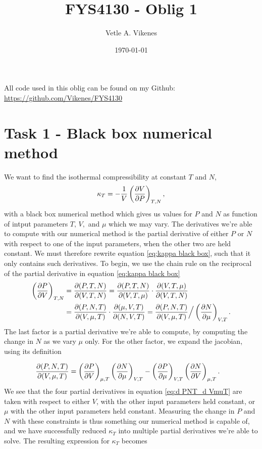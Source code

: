 \documentclass[reprint,english,notitlepage,aps,nobalancelastpage,nofootinbib]{revtex4-1}
\newcommand{\closed}[1]{\left(#1\right)}
\newcommand{\kt}{\kappa_T}
\newcommand{\tmdv}[4]{\closed{\pdv{#1}{#2}}_{#3,#4}}
\newcommand{\jacobian}[2]{\pdv{(#1)}{(#2)}}
\begin{document}
\begin{center}
\title{\Huge FYS4130 - Oblig 1}
\author{\large Vetle A. Vikenes}
\date{\today}
\noaffiliation


\maketitle
\end{center}
\onecolumngrid

All code used in this oblig can be found on my Github: \url{https://github.com/Vikenes/FYS4130}

\section*{\large Task 1 - Black box numerical method}
We want to find the isothermal compressibility at constant $T$ and $N$,
\begin{align} \label{eq:kappa black box}
	\kt = -\frac{1}{V}\closed{\pdv{V}{P}}_{T,N},
\end{align}
with a black box numerical method which gives us values for $P$ and $N$ as function of intput parameters $T,\,V,$ and $\mu$ which we may vary. The derivatives we're able to compute with our numerical method is the partial derivative of either $P$ or $N$ with respect to one of the input parameters, when the other two are held constant. We must therefore rewrite equation \eqref{eq:kappa black box}, such that it only contains such derivatives. To begin, we use the chain rule on the reciprocal of the partial derivative in equation \eqref{eq:kappa black box}
\begin{align*}
	\tmdv{P}{V}{T}{N} &= \jacobian{P,T,N}{V,T,N}=\jacobian{P,T,N}{V,T,\mu}\cdot\jacobian{V,T,\mu}{V,T,N} \\
	&= \jacobian{P,N,T}{V,\mu,T}\cdot\jacobian{\mu,V,T}{N,V,T}=
	\jacobian{P,N,T}{V,\mu,T} \Big/ \tmdv{N}{\mu}{V}{T}.
\end{align*}
The last factor is a partial derivative we're able to compute, by computing the change in $N$ as we vary $\mu$ only. For the other factor, we expand the jacobian, using its definition 

\begin{align}
	\jacobian{P,N,T}{V,\mu,T} &= \tmdv{P}{V}{\mu}{T}\tmdv{N}{\mu}{V}{T}-\tmdv{P}{\mu}{V}{T}\tmdv{N}{V}{\mu}{T}. \label{eq:d PNT_d VmuT}
\end{align}
We see that the four partial derivatives in equation \eqref{eq:d PNT_d VmuT} are taken with respect to either $V$, with the other input parameters held constant, or $\mu$ with the other input parameters held constant. Measuring the change in $P$ and $N$ with these constraints is thus something our numerical method is capable of, and we have successfully reduced $\kt$ into multiple partial derivatives we're able to solve. The resulting expression for $\kt$ becomes  
\end{document}

